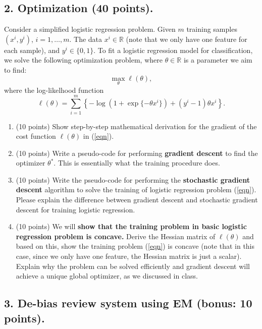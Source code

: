 \documentclass[12pt]{article}
\begin{document}
\subsection*{\bf 2. Optimization (40 points).}

Consider a simplified logistic regression problem. 
Given $m$ training samples $(x^i, y^i)$, $i = 1, \ldots, m$. The data $x^i \in \mathbb R$ (note that we only have one feature for each sample), and $y^i \in \{0, 1\}$.  To fit a logistic regression model for classification, we solve the following optimization problem, where $\theta \in \mathbb R$ is a parameter we aim to find:
\begin{equation}
\max_\theta \ell (\theta), \label{eqn}
\end{equation}
where the log-likelhood function \[\ell(\theta) = \sum_{i=1}^m \left\{-\log (1+\exp\{-\theta x^i\}) + (y^i-1) \theta x^i\right\}.\]

\begin{enumerate}
\item (10 points) Show step-by-step mathematical derivation for the gradient of the cost function $\ell(\theta)$ in (\ref{eqn}).
\item (10 points) Write a pseudo-code  for performing {\bf gradient descent} to find the optimizer $\theta^*$. This is essentially what the training procedure does. 
\item (10 points) Write the pseudo-code for performing the {\bf stochastic gradient descent} algorithm to solve the training of logistic regression problem (\ref{eqn}). Please explain the difference between gradient descent and stochastic gradient descent for training logistic regression.
\item (10 points) We will {\bf show that the training problem in basic logistic regression problem is concave.} Derive the Hessian matrix of $\ell(\theta)$ and based on this, show the training problem (\ref{eqn}) is concave (note that in this case, since we only have one feature, the Hessian matrix is just a scalar). Explain why the problem can be solved efficiently and gradient descent will achieve a unique global optimizer, as we discussed in class. 
\end{enumerate}



\subsection*{3. De-bias review system using EM (bonus: 10 points).} 
\end{document}
